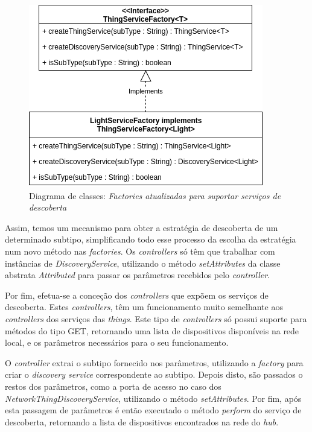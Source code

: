 \begin{figure}[H]
  \centering
        \includegraphics[scale=0.6]{img/hub-factories-discovery.png}
  \caption{Diagrama de classes: \textit{Factories atualizadas para suportar serviços de descoberta}}
\end{figure}

Assim, temos um mecanismo para obter a estratégia de descoberta de um determinado subtipo, simplificando todo esse processo da escolha da estratégia num novo método nas \textit{factories}. Os \textit{controllers} só têm que trabalhar com instâncias de \textit{DiscoveryService}, utilizando o método \textit{setAttributes} da classe abstrata \textit{Attributed} para passar os parâmetros recebidos pelo \textit{controller}.

Por fim, efetua-se a conceção dos \textit{controllers} que expõem os serviços de descoberta. Estes \textit{controllers}, têm um funcionamento muito semelhante aos \textit{controllers} dos serviços das \textit{things}. Este tipo de \textit{controllers} só possui suporte para métodos do tipo GET, retornando uma lista de dispositivos disponíveis na rede local, e os parâmetros necessários para o seu funcionamento.


O \textit{controller} extrai o subtipo fornecido nos parâmetros, utilizando a \textit{factory} para criar o \textit{discovery service} correspondente ao subtipo. Depois disto, são passados o restos dos parâmetros, como a porta de acesso no caso dos \textit{NetworkThingDiscoveryService}, utilizando o método \textit{setAttributes}. Por fim, após esta passagem de parâmetros é então executado o método \textit{perform} do serviço de descoberta, retornando a lista de dispositivos encontrados na rede do \textit{hub}.

